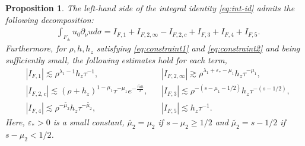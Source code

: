 ﻿\documentclass[11pt,reqno,oneside]{amsart}
\newtheorem{proposition}[theorem]{Proposition}
\theoremstyle{definition}
\theoremstyle{remark}
\newcommand{\e}{\varepsilon}
\newcommand{\lm}{\lambda}
\newcommand{\p}{\partial}
\begin{document}
        \begin{proposition}\label{prop:lowerbound}
            The left-hand side of the integral identity \eqref{eq:int-id} admits the following decomposition:
            \begin{align*}
                &\int_{F_\pm} u_0\p_\nu u d\sigma = I_{F,1} + I_{F,2,\infty}-I_{F,2,c} + I_{F,3} + I_{F,4} + I_{F,5}.
            \end{align*}
            Furthermore, for $\rho,h,h_z$ satisfying \eqref{eq:constraint1} and \eqref{eq:constraint2} and being sufficiently small, the following estimates hold for each term,
            \begin{align*}                
                &|I_{F,1}|\lesssim  \rho^{\lm_1-1}h_z\tau^{-1}, &  &|I_{F,2,\infty}| \gtrsim \rho^{\lm_1+\e_*-\mu_1} h_z \tau^{-\mu_1},\\
                &|I_{F,2,c}| \lesssim (\rho+h_z)^{1-\mu_1}\tau^{-\mu_1} e^{-\frac{\tau \widetilde{a} h}{2}}, &  &|I_{F,3}| \lesssim \rho^{-(s-\mu_1-1/2)}h_z \tau^{-(s-1/2)},\\
                &|I_{F,4}| \lesssim \rho^{-\widetilde{\mu_2}}h_z\tau^{-\widetilde{\mu_2}},&  &|I_{F,5}| \lesssim h_z\tau^{-1}.
            \end{align*}
            Here, $\e_*>0$ is a small constant, $\widetilde{\mu_2}=\mu_2$ if $s-\mu_2\geq 1/2$ and $\widetilde{\mu_2}=s-1/2$ if $s-\mu_2< 1/2$.
        \end{proposition}
\end{document}
